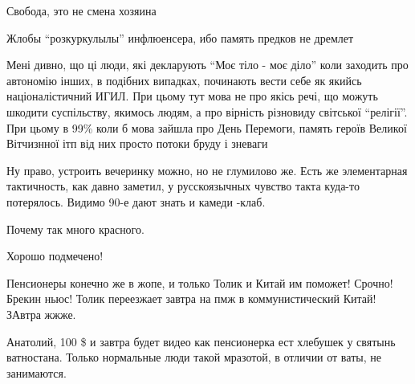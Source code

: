 \begin{itemize}
Свобода, это не смена хозяина

Жлобы \enquote{розкуркулылы} инфлюенсера, ибо память предков не дремлет


Мені дивно, що ці люди, які декларують \enquote{Моє тіло - моє діло} коли заходить про
автономію інших, в подібних випадках, починають вести себе як якийсь
націоналістичний ИГИЛ. При цьому тут мова не про якісь речі, що можуть шкодити
суспільству, якимось людям, а про вірність різновиду світської \enquote{релігії}. При
цьому в 99\% коли б мова зайшла про День Перемоги, память героїв Великої
Вітчизнної ітп від них просто потоки бруду і зневаги


Ну право, устроить вечеринку можно, но не глумилово же. Есть же элементарная
тактичность, как давно заметил, у русскоязычных чувство такта куда-то
потерялось. Видимо 90-е дают знать и камеди -клаб.

Почему так много красного.

Хорошо подмечено!


Пенсионеры конечно же в жопе, и только Толик и Китай им поможет! Срочно! Брекин
ньюс! Толик переезжает завтра на пмж в коммунистический Китай! ЗАвтра жжже.

Анатолий, 100 \$ и завтра будет видео как пенсионерка ест хлебушек у святынь
ватностана. Только нормальные люди такой мразотой, в отличии от ваты, не
занимаются.

\end{itemize} %
